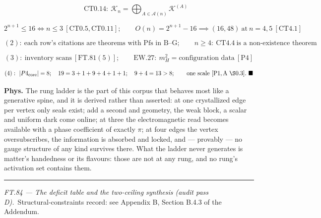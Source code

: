 \begin{theorem}
\[
\qquad \mathrm{CT0.14}:\ \mathcal K_n=\bigoplus_{A\in\mathcal A(n)}\mathcal K^{(A)}
\]

\[
2^{n+1}\le16\iff n\le3\ [\mathrm{CT0.5},\mathrm{CT0.11}];\qquad O(n)=2^{n+1}-16\implies(16,48)\ \text{at}\ n=4,5\ [\mathrm{CT4.1}]
\]

\[
(2):\ \text{each row's citations are theorems with Pfs in B–G};\qquad n\ge4:\ \mathrm{CT4.4}\ \text{is a non-existence theorem}
\]

\[
(3):\ \text{inventory scans}\ [\mathrm{FT.81}(5)];\qquad\text{EW.27}:\ m_H^2=\text{configuration data}\ [\mathrm{P4}]
\]

\[
(4):\ |P4_{\mathrm{core}}|=8;\quad19=3+1+9+4+1+1;\quad9+4=13>8;\qquad\text{one scale}\ [\mathrm{P1},\text{A}\ \S0.3].\ \blacksquare
\]

\textbf{Phys.} The rung ladder is the part of this corpus that behaves most like a generative spine, and it is derived rather than asserted: at one crystallized edge per vertex only seals exist; add a second and geometry, the weak block, a scalar and uniform dark come online; at three the electromagnetic read becomes available with a phase coefficient of exactly $\pi$; at four edges the vertex oversubscribes, the information is absorbed and locked, and — provably — no gauge structure of any kind survives there. What the ladder never generates is matter's handedness or its flavours: those are not at any rung, and no rung's activation set contains them.

\vspace{2pt}\noindent\rule{\textwidth}{0.4pt}\vspace{2pt}

\end{theorem}

\medskip\noindent\textit{\texorpdfstring{FT.84 — The deficit table and the two-ceiling synthesis (audit pass D)}{FT.84 - The deficit table and the two-ceiling synthesis (audit pass D)}.}\ Structural-constraints record: see Appendix B, Section B.4.3 of the Addendum.\par\medskip

